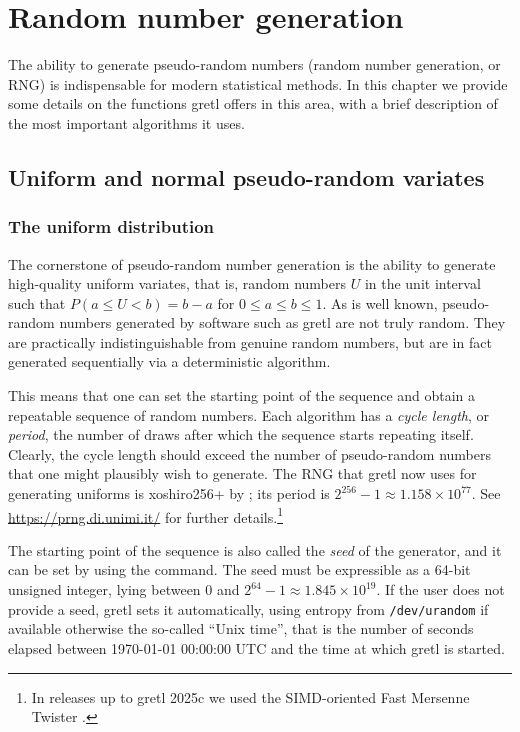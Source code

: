 \chapter{Random number generation}
\label{chap:randgen}

The ability to generate pseudo-random numbers (random number
generation, or RNG) is indispensable for modern statistical
methods. In this chapter we provide some details on the functions
gretl offers in this area, with a brief description of the most
important algorithms it uses.

\section{Uniform and normal pseudo-random variates}
\label{sec:randgen-uni-norm}

\subsection{The uniform distribution}
\label{sec:randgen-uni}

The cornerstone of pseudo-random number generation is the ability to
generate high-quality uniform variates, that is, random numbers $U$ in
the unit interval such that $P(a \le U < b) = b - a$ for
$0 \le a \le b \le 1$. As is well known, pseudo-random numbers generated by
software such as gretl are not truly random. They are practically
indistinguishable from genuine random numbers, but are in fact
generated sequentially via a deterministic algorithm.

This means that one can set the starting point of the sequence and
obtain a repeatable sequence of random numbers. Each algorithm has a
\emph{cycle length}, or \emph{period}, the number of draws after which
the sequence starts repeating itself. Clearly, the cycle length should
exceed the number of pseudo-random numbers that one might plausibly
wish to generate.  The RNG that gretl now uses for generating uniforms
is \textsf{xoshiro256+} by \citet{blackman-vigna22}; its period is
$2^{256} - 1 \approx 1.158 \times 10^{77}$. See
\url{https://prng.di.unimi.it/} for further details.\footnote{In
  releases up to gretl 2025c we used the SIMD-oriented Fast Mersenne
  Twister \citep{saito_matsumoto08}.}

The starting point of the sequence is also called the \emph{seed} of
the generator, and it can be set by using the  command.
The seed must be expressible as a 64-bit unsigned integer, lying
between 0 and $2^{64} - 1 \approx 1.845 \times 10^{19}$. If the user
does not provide a seed, gretl sets it automatically, using entropy
from \texttt{/dev/urandom} if available otherwise the so-called ``Unix
time'', that is the number of seconds elapsed between 1970-01-01
00:00:00 UTC and the time at which gretl is started.

